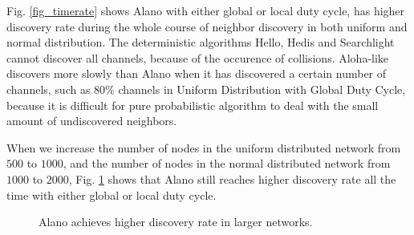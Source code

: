 Fig. \ref{fig_timerate} shows Alano with either global or local duty cycle, has higher discovery rate during the whole course of neighbor discovery in both uniform and normal distribution. The deterministic algorithms Hello, Hedis and Searchlight cannot discover all channels, because of the occurence of collisions. Aloha-like discovers more slowly than Alano when it has discovered a certain number of channels, such as $80\%$ channels in Uniform Distribution with Global Duty Cycle, because it is difficult for pure probabilistic algorithm to deal with the small amount of   undiscovered neighbors.




When we increase the number of nodes in the uniform distributed  network from $500$ to $1000$, and the number of nodes in the normal distributed network from $1000$ to $2000$, Fig. \ref{fig_timerate_large} shows that Alano still reaches higher discovery rate all the time with either global or local duty cycle.

\begin{figure}[!h]

\hspace{0.01in}
\hspace{0.01in}
\hspace{0.01in}
\caption{Alano achieves higher discovery rate in larger networks.}
\label{fig_timerate_large}
\end{figure}





